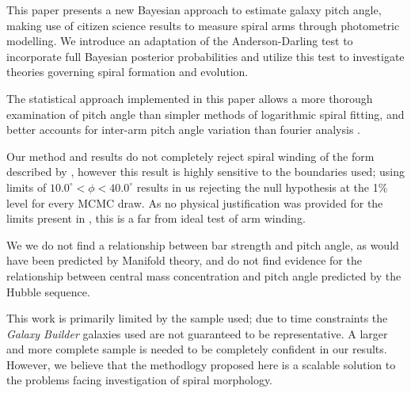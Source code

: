 This paper presents a new Bayesian approach to estimate galaxy pitch angle, making use of citizen science results to measure spiral arms through photometric modelling. We introduce an adaptation of the Anderson-Darling test to incorporate full Bayesian posterior probabilities and utilize this test to investigate theories governing spiral formation and evolution.

The statistical approach implemented in this paper allows a more thorough examination of pitch angle than simpler methods of logarithmic spiral fitting, and better accounts for inter-arm pitch angle variation than fourier analysis .

Our method and results do not completely reject spiral winding of the form described by \citet{2019arXiv190910291P}, however this result is highly sensitive to the boundaries used; using limits of $10.0^\circ < \phi < 40.0^\circ$ results in us rejecting the null hypothesis at the 1\% level for every MCMC draw. As no physical justification was provided for the limits present in \citet{2019arXiv190910291P}, this is a far from ideal test of arm winding.

We we do not find a relationship between bar strength and pitch angle, as would have been predicted by Manifold theory, and do not find evidence for the relationship between central mass concentration and pitch angle predicted by the Hubble sequence.

This work is primarily limited by the sample used; due to time constraints the \textit{Galaxy Builder} galaxies used are not guaranteed to be representative. A larger and more complete sample is needed to be completely confident in our results. However, we believe that the methodlogy proposed here is a scalable solution to the problems facing investigation of spiral morphology.
